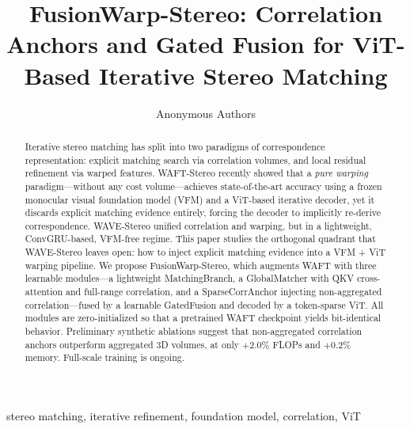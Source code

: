 \documentclass[conference]{IEEEtran}
\begin{document}
\title{FusionWarp-Stereo: Correlation Anchors and Gated Fusion for ViT-Based Iterative Stereo Matching}

\author{Anonymous Authors}

\maketitle

\begin{abstract}
Iterative stereo matching has split into two paradigms of correspondence representation: explicit matching search via correlation volumes, and local residual refinement via warped features. WAFT-Stereo recently showed that a \emph{pure warping} paradigm---without any cost volume---achieves state-of-the-art accuracy using a frozen monocular visual foundation model (VFM) and a ViT-based iterative decoder, yet it discards explicit matching evidence entirely, forcing the decoder to implicitly re-derive correspondence. WAVE-Stereo unified correlation and warping, but in a lightweight, ConvGRU-based, VFM-free regime. This paper studies the orthogonal quadrant that WAVE-Stereo leaves open: how to inject explicit matching evidence into a VFM + ViT warping pipeline. We propose FusionWarp-Stereo, which augments WAFT with three learnable modules---a lightweight MatchingBranch, a GlobalMatcher with QKV cross-attention and full-range correlation, and a SparseCorrAnchor injecting non-aggregated correlation---fused by a learnable GatedFusion and decoded by a token-sparse ViT. All modules are zero-initialized so that a pretrained WAFT checkpoint yields bit-identical behavior. Preliminary synthetic ablations suggest that non-aggregated correlation anchors outperform aggregated 3D volumes, at only $+2.0\%$ FLOPs and $+0.2\%$ memory. Full-scale training is ongoing.
\end{abstract}

\begin{IEEEkeywords}
stereo matching, iterative refinement, foundation model, correlation, ViT
\end{IEEEkeywords}
\end{document}
